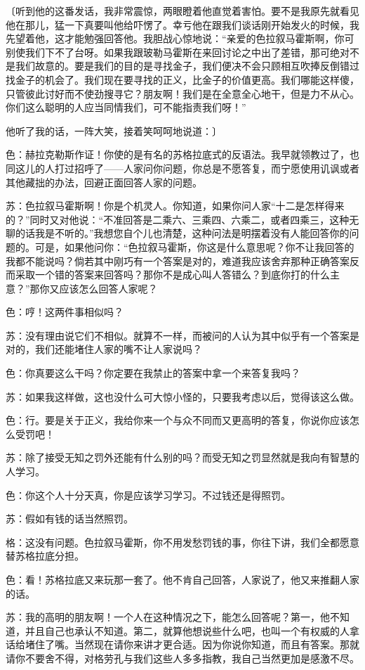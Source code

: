 \documentclass[11pt,oneside]{book}
\begin{document}
\begin{common-format}
〔听到他的这番发话，我非常震惊，两眼瞪着他直觉着害怕。要不是我原先就看见他在那儿，猛一下真要叫他给吓愣了。幸亏他在跟我们谈话刚开始发火的时候，我先望着他，这才能勉强回答他。我胆战心惊地说：“亲爱的色拉叙马霍斯啊，你可别使我们下不了台呀。如果我跟玻勒马霍斯在来回讨论之中出了差错，那可绝对不是我们故意的。要是我们的目的是寻找金子，我们便决不会只顾相互吹捧反倒错过找金子的机会了。我们现在要寻找的正义，比金子的价值更高。我们哪能这样傻，只管彼此讨好而不使劲搜寻它？朋友啊！我们是在全意全心地干，但是力不从心。你们这么聪明的人应当同情我们，可不能指责我们呀！”

他听了我的话，一阵大笑，接着笑呵呵地说道：〕

色：赫拉克勒斯作证！你使的是有名的苏格拉底式的反语法。我早就领教过了，也同这儿的人打过招呼了——人家问你问题，你总是不愿答复，而宁愿使用讥讽或者其他藏拙的办法，回避正面回答人家的问题。

苏：色拉叙马霍斯啊！你是个机灵人。你知道，如果你问人家“十二是怎样得来的？”同时又对他说：“不准回答是二乘六、三乘四、六乘二，或者四乘三，这种无聊的话我是不听的。”我想您自个儿也清楚，这种问法是明摆着没有人能回答你的问题的。可是，如果他问你：“色拉叙马霍斯，你这是什么意思呢？你不让我回答的我都不能说吗？倘若其中刚巧有一个答案是对的，难道我应该舍弃那种正确答案反而采取一个错的答案来回答吗？那你不是成心叫人答错么？到底你打的什么主意？”那你又应该怎么回答人家呢？

色：哼！这两件事相似吗？

苏：没有理由说它们不相似。就算不一样，而被问的人认为其中似乎有一个答案是对的，我们还能堵住人家的嘴不让人家说吗？

色：你真要这么干吗？你定要在我禁止的答案中拿一个来答复我吗？

苏：如果我这样做，这也没什么可大惊小怪的，只要我考虑以后，觉得该这么做。

色：行。要是关于正义，我给你来一个与众不同而又更高明的答复，你说你应该怎么受罚吧！

苏：除了接受无知之罚外还能有什么别的吗？而受无知之罚显然就是我向有智慧的人学习。

色：你这个人十分天真，你是应该学习学习。不过钱还是得照罚。

苏：假如有钱的话当然照罚。

格：这没有问题。色拉叙马霍斯，你不用发愁罚钱的事，你往下讲，我们全都愿意替苏格拉底分担。

色：看！苏格拉底又来玩那一套了。他不肯自己回答，人家说了，他又来推翻人家的话。

苏：我的高明的朋友啊！一个人在这种情况之下，能怎么回答呢？第一，他不知道，并且自己也承认不知道。第二，就算他想说些什么吧，也叫一个有权威的人拿话给堵住了嘴。当然现在请你来讲才更合适。因为你说你知道，而且有答案。那就请你不要舍不得，对格劳孔与我们这些人多多指教，我自己当然更加是感激不尽。


\end{common-format}
\end{document}
